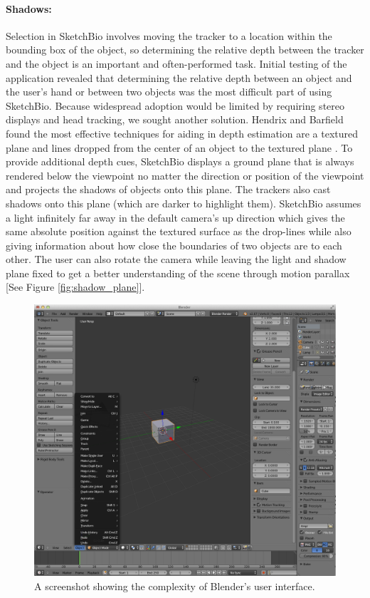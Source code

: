 \documentclass[twocolumn]{bmcart}%
\begin{document}
\paragraph*{Shadows:}
Selection in SketchBio involves moving the tracker to a location within the bounding box of the object, so determining the relative depth between the tracker and the object is an important and often-performed task.
Initial testing of the application revealed that determining the relative depth between an object and the user's hand or between two objects was the most difficult part of using SketchBio.
Because widespread adoption would be limited by requiring stereo displays and head tracking, we sought another solution.
Hendrix and Barfield found the most effective techniques for aiding in depth estimation are a textured plane and lines dropped from the center of an object to the textured plane \cite{hendrix1995relationship}.
To provide additional depth cues, SketchBio displays a ground plane that is always rendered below the viewpoint no matter the direction or position of the viewpoint and projects the shadows of objects onto this plane.
The trackers also cast shadows onto this plane (which are darker to highlight them).
SketchBio assumes a light infinitely far away in the default camera's up direction which gives the same absolute position against the textured surface as the drop-lines while also giving information about how close the boundaries of two objects are to each other.
The user can also rotate the camera while leaving the light and shadow plane fixed to get a better understanding of the scene through motion parallax [See Figure \ref{fig:shadow_plane}].

\begin{figure}[h]
\centering
\includegraphics[width=0.9\columnwidth]{blender_interface.png}
\caption{A screenshot showing the complexity of Blender's user interface.}
\label{fig:blender_interface}
\end{figure}
\end{document}

